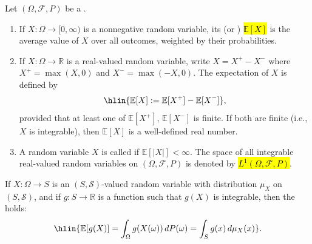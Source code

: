 \begin{definition} \label{definition:expectation_of_a_random_variable_on_a_probability_space}
Let $(\Omega, \mathcal{F}, P)$ be a .

\begin{enumerate}
    \item If $X : \Omega \to [0, \infty)$ is a nonnegative random variable, its  (or ) \hl{$\mathbb{E}[X]$} is the average value of $X$ over all outcomes, weighted by their probabilities.

    \item If $X : \Omega \to \mathbb{R}$ is a real-valued random variable, write $X = X^+ - X^-$ where $X^+ = \max(X, 0)$ and $X^- = \max(-X, 0)$. The expectation of $X$ is defined by
    $$\hlin{\mathbb{E}[X] := \mathbb{E}[X^+] - \mathbb{E}[X^-]},$$
    provided that at least one of $\mathbb{E}[X^+]$, $\mathbb{E}[X^-]$ is finite. If both are finite (i.e., $X$ is integrable), then $\mathbb{E}[X]$ is a well-defined real number.

    \item A random variable $X$ is called  if $\mathbb{E}[|X|] < \infty$. The space of all integrable real-valued random variables on $(\Omega, \mathcal{F}, P)$ is denoted by \hl{$L^1(\Omega, \mathcal{F}, P)$}.
\end{enumerate}

If $X : \Omega \to S$ is an $(S, \mathcal{S})$-valued random variable with distribution $\mu_X$ on $(S, \mathcal{S})$, and if $g : S \to \mathbb{R}$ is a function such that $g(X)$ is integrable, then the  holds:
$$\hlin{\mathbb{E}[g(X)] = \int_\Omega g(X(\omega))\,dP(\omega) = \int_S g(x)\,d\mu_X(x)}.$$
\end{definition}


